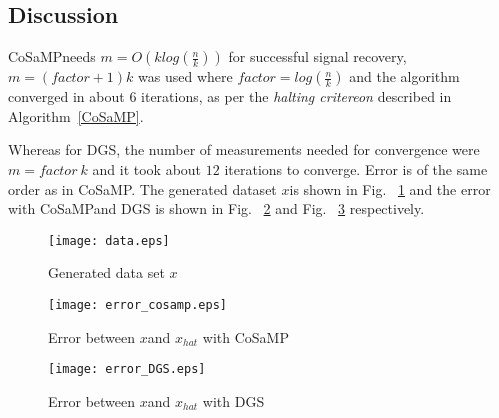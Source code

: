 \documentclass[12pt]{article}
\theoremstyle{definition}
\def\x{$x$\hspace{0.1in}}
\def\cosamp{CoSaMP\hspace{0.1in}}
\begin{document}
  \subsection{Discussion}
  \cosamp needs $m=O(klog(\frac{n}{k}))$ for successful signal recovery, $m=(factor+1)k$ was used where
  $factor=log(\frac{n}{k})$ and the algorithm converged in about $6$ iterations, as per the \textit{halting critereon}
  described in Algorithm~\ref{CoSaMP}. 
  \par Whereas for DGS, the number of measurements needed for convergence were $m=factor \ k$ and
  it took about $12$ iterations to converge. Error is of the same order as in \cosamp.
  The generated dataset \x is shown in Fig. ~\ref{fig:dataset} 
  and the error with \cosamp and DGS is shown in Fig. ~\ref{fig:error_cosamp} and 
  Fig. ~\ref{fig:error_dgs} respectively.\\
  \begin{figure}[H]
  \label{fig:dataset}
	\begin{center}
	\texttt{[image: data.eps]}
	\caption{Generated data set \x} 
	\end{center}
	
\end{figure}
\begin{figure}[H]
	\begin{center}
	\texttt{[image: error\_cosamp.eps]}
	\caption{Error between \x and $x_{hat}$ with CoSaMP} 
	\end{center}
	\label{fig:error_cosamp}
\end{figure}
\begin{figure}[H]
	\begin{center}
	\texttt{[image: error\_DGS.eps]}
	\caption{Error between \x and $x_{hat}$ with DGS}
	\end{center}
	\label{fig:error_dgs}
\end{figure}
\end{document}

